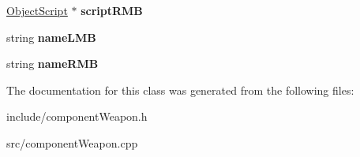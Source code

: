 \begin{DoxyCompactItemize}
\item 
\hypertarget{classComponentTemplateWeapon_a467a6ded2ac74d7d96d6a9c6b24d9e21}{
\hyperlink{classObjectScript}{\-Object\-Script} $\ast$ {\bfseries script\-R\-M\-B}}
\label{d3/d10/classComponentTemplateWeapon_a467a6ded2ac74d7d96d6a9c6b24d9e21}

\item 
\hypertarget{classComponentTemplateWeapon_a622f778efb8ec800f915e30a552084d7}{
string {\bfseries name\-L\-M\-B}}
\label{d3/d10/classComponentTemplateWeapon_a622f778efb8ec800f915e30a552084d7}

\item 
\hypertarget{classComponentTemplateWeapon_af910ae8b5bd73ca810d62c762914e7ee}{
string {\bfseries name\-R\-M\-B}}
\label{d3/d10/classComponentTemplateWeapon_af910ae8b5bd73ca810d62c762914e7ee}

\end{DoxyCompactItemize}


\-The documentation for this class was generated from the following files\-:\begin{DoxyCompactItemize}
\item 
include/component\-Weapon.\-h\item 
src/component\-Weapon.\-cpp\end{DoxyCompactItemize}

